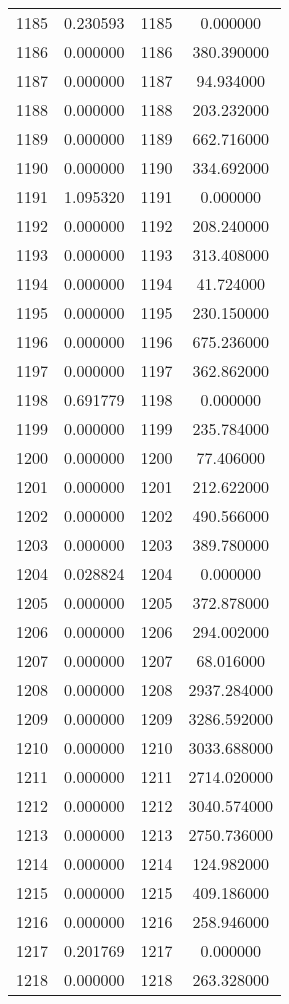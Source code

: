 \documentclass[12pt]{article}
\begin{document}
\begin{longtable}{@{}cccc@{}}
1185 & 0.230593 & 1185 & 0.000000 \\
1186 & 0.000000 & 1186 & 380.390000 \\
1187 & 0.000000 & 1187 & 94.934000 \\
1188 & 0.000000 & 1188 & 203.232000 \\
1189 & 0.000000 & 1189 & 662.716000 \\
1190 & 0.000000 & 1190 & 334.692000 \\
1191 & 1.095320 & 1191 & 0.000000 \\
1192 & 0.000000 & 1192 & 208.240000 \\
1193 & 0.000000 & 1193 & 313.408000 \\
1194 & 0.000000 & 1194 & 41.724000 \\
1195 & 0.000000 & 1195 & 230.150000 \\
1196 & 0.000000 & 1196 & 675.236000 \\
1197 & 0.000000 & 1197 & 362.862000 \\
1198 & 0.691779 & 1198 & 0.000000 \\
1199 & 0.000000 & 1199 & 235.784000 \\
1200 & 0.000000 & 1200 & 77.406000 \\
1201 & 0.000000 & 1201 & 212.622000 \\
1202 & 0.000000 & 1202 & 490.566000 \\
1203 & 0.000000 & 1203 & 389.780000 \\
1204 & 0.028824 & 1204 & 0.000000 \\
1205 & 0.000000 & 1205 & 372.878000 \\
1206 & 0.000000 & 1206 & 294.002000 \\
1207 & 0.000000 & 1207 & 68.016000 \\
1208 & 0.000000 & 1208 & 2937.284000 \\
1209 & 0.000000 & 1209 & 3286.592000 \\
1210 & 0.000000 & 1210 & 3033.688000 \\
1211 & 0.000000 & 1211 & 2714.020000 \\
1212 & 0.000000 & 1212 & 3040.574000 \\
1213 & 0.000000 & 1213 & 2750.736000 \\
1214 & 0.000000 & 1214 & 124.982000 \\
1215 & 0.000000 & 1215 & 409.186000 \\
1216 & 0.000000 & 1216 & 258.946000 \\
1217 & 0.201769 & 1217 & 0.000000 \\
1218 & 0.000000 & 1218 & 263.328000 \\

\end{longtable}
\end{document}
